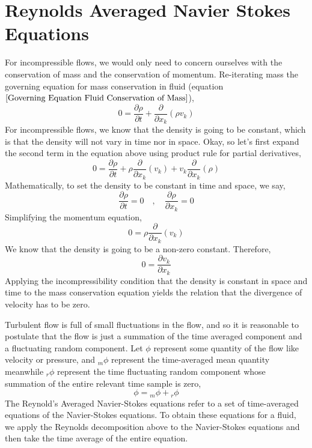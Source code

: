 \chapter{Reynolds Averaged Navier Stokes Equations}


For incompressible flows, we would only need to concern ourselves with the conservation of mass and the conservation of momentum. 
Re-iterating mass the governing equation for mass conservation in fluid (equation $\ref{Governing Equation Fluid Conservation of Mass}$),
$$0 = \frac{\partial \rho}{\partial t} + \frac{\partial}{\partial x_{k}} (\rho v_{k}) $$
For incompressible flows, we know that the density is going to be constant, which is that the density will not vary in time nor in space.
Okay, so let's first expand the second term in the equation above using product rule for partial derivatives,
$$0 = \frac{\partial \rho}{\partial t} + \rho \frac{\partial}{\partial x_{k}} (v_{k}) + v_{k}\frac{\partial}{\partial x_{k}} (\rho)$$
Mathematically, to set the density to be constant in time and space, we say,
$$\frac{\partial \rho}{\partial t} = 0 \quad,\quad \frac{\partial \rho}{\partial x_{k}} = 0$$ 
Simplifying the momentum equation,
$$0 = \rho \frac{\partial}{\partial x_{k}} (v_{k})$$
We know that the density is going to be a non-zero constant. Therefore,
\begin{equation}0 = \frac{\partial v_{k}}{\partial x_{k}} \label{Mass Conservation Fluids Incompressible}\end{equation}
Applying the incompressibility condition that the density is constant in space and time to the mass conservation equation yields the relation that the divergence of velocity has to be zero.

Turbulent flow is full of small fluctuations in the flow, and so it is reasonable to postulate that the flow is just a summation of the time averaged component and a fluctuating random component.
Let $\phi$ represent some quantity of the flow like velocity or pressure, and ${}_{m}\phi$ represent the time-averaged mean quantity meanwhile ${}_{r}\phi$ represent the time fluctuating random component whose summation of the entire relevant time sample is zero,
\begin{equation}
\phi = {}_{m}\phi + {}_{r}\phi 
\label{Reynolds Averaging Decomposition}
\end{equation}
The Reynold's Averaged Navier-Stokes equations refer to a set of time-averaged equations of the Navier-Stokes equations.
To obtain these equations for a fluid, we apply the Reynolds decomposition above to the Navier-Stokes equations and then take the time average of the entire equation.

